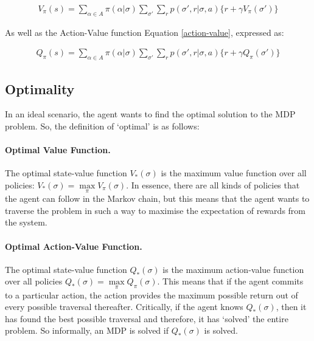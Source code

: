 \documentclass[ %
                    author={Ashwinder Khurana},
                supervisor={Prof Dave Cliff},
                    degree={MEng},
                     title={The Deeply Reinforced Trader},
                  subtitle={},
                      type={enterprise},
                      year={2020} ]{dissertation}
\begin{document}
{\begin{equation}
\label{value-function-bellman}
\begin{split}
V_\pi(s) = \sum\limits^{}_{\alpha \in A}{\pi(\alpha | \sigma)} \sum\limits^{}_{\sigma'}{\sum\limits^{}_{r}{p(\sigma' , r | \sigma, a) \{r + \gamma V_\pi(\sigma')\}}}
\end{split}
\end{equation}

\noindent
As well as the Action-Value function Equation \ref{action-value}, expressed as:

\begin{equation}
\label{action-value-bellman}
\begin{split}
Q_\pi(s) = \sum\limits^{}_{\alpha \in A}{\pi(\alpha | \sigma)} \sum\limits^{}_{\sigma'}{\sum\limits^{}_{r}{p(\sigma' , r | \sigma, a) \{r + \gamma Q_\pi(\sigma')\}}}
\end{split}
\end{equation}
\vspace{0.5cm}

\subsection{Optimality}
\label{Optimality}

In an ideal scenario, the agent wants to find the optimal solution to the MDP problem. So, the definition of \enquote*{optimal} is as follows:

\paragraph{Optimal Value Function.} The optimal state-value function $V_*(\sigma)$ is the maximum value function over all policies: $V_*(\sigma) = \max\limits_\pi V_\pi(\sigma)$. In essence, there are all kinds of policies that the agent can follow in the Markov chain, but this means that the agent wants to traverse the problem in such a way to maximise the expectation of rewards from the system. 
 
\paragraph{Optimal Action-Value Function.} The optimal state-value function $Q_*(\sigma)$ is the maximum action-value function over all policies $Q_*(\sigma) = \max\limits_\pi Q_\pi(\sigma)$. This means that if the agent commits to a particular action, the action provides the maximum possible return out of every possible traversal thereafter. Critically, if the agent knows $Q_*(\sigma)$, then it has found the best possible traversal and therefore, it has \enquote*{solved} the entire problem. So informally, an MDP is solved if  $Q_*(\sigma)$ is solved.

}
\end{document}
